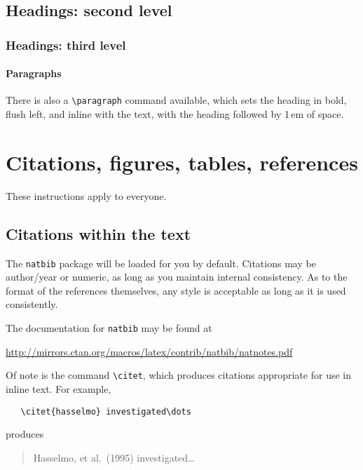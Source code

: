 \documentclass{article}
\begin{document}
\subsection{Headings: second level}

\subsubsection{Headings: third level}

\paragraph{Paragraphs}


There is also a \verb+\paragraph+ command available, which sets the heading in
bold, flush left, and inline with the text, with the heading followed by 1\,em
of space.


\section{Citations, figures, tables, references}
\label{others}


These instructions apply to everyone.


\subsection{Citations within the text}


The \verb+natbib+ package will be loaded for you by default.  Citations may be
author/year or numeric, as long as you maintain internal consistency.  As to the
format of the references themselves, any style is acceptable as long as it is
used consistently.


The documentation for \verb+natbib+ may be found at
\begin{center}
  \url{http://mirrors.ctan.org/macros/latex/contrib/natbib/natnotes.pdf}
\end{center}
Of note is the command \verb+\citet+, which produces citations appropriate for
use in inline text.  For example,
\begin{verbatim}
   \citet{hasselmo} investigated\dots
\end{verbatim}
produces
\begin{quote}
  Hasselmo, et al.\ (1995) investigated\dots
\end{quote}
\end{document}
